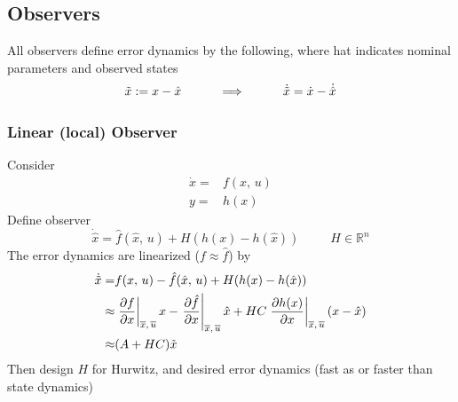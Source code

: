 \documentclass[twocolumn]{article}    %
\begin{document}
\subsection*{Observers}
All observers define error dynamics by the following, where hat indicates nominal parameters and observed states
\begin{equation*}
    \Tilde{x} := x - \hat{x} \hspace{30pt} \Longrightarrow \hspace{30pt} \dot{\Tilde{x}} = \dot{x} - \dot{\hat{x}}
\end{equation*}
\subsubsection*{Linear (local) Observer}
Consider
\begin{align*}
    \dot{x} =& f(x,\,u)\\
    y =& h(x)
\end{align*}
Define observer
\begin{equation*}
    \dot{\hat{x}} = \hat{f} ( \hat{x},\,u)  + H (h(x) - h(\hat{x})) \hspace{30pt} H\in\mathds{R}^n
\end{equation*}
The error dynamics are linearized (\(f \approx \hat{f}\)) by
\begin{align*}
    \dot{\Tilde{x}} =& f(x,\,u) - \hat{f}(\hat{x},\, u) + H (h(x) - h(\hat{x}))\\
     \approx & \left.\frac{\partial f}{\partial x}\right|_{\overline{x},\,\overline{u}} x - \left.\frac{\partial \hat{f}}{\partial x}\right|_{\overline{x},\,\overline{u}}\hat{x} + HC \left.\frac{\partial h(x)}{\partial x}\right|_{\overline{x},\,\overline{u}}(x-\hat{x})\\
     \approx & (A+HC)\Tilde{x}
\end{align*}
Then design \(H\) for Hurwitz, and desired error dynamics (fast as or faster than state dynamics)
\end{document}
